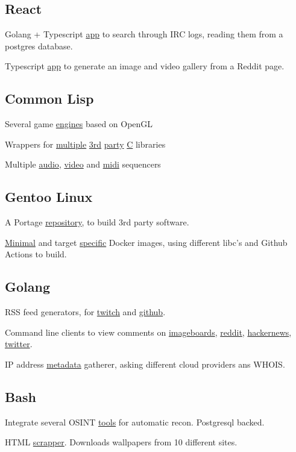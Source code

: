 \documentclass[11pt]{article}
\newcommand{\git}[2]{\href {https://github.com/azimut/#2} {#1}}
\newcommand{\project}{\item}
\begin{document}
\subsection{React}
\begin{projects}
\project Golang + Typescript {\git{app}{rounded}} to search through IRC logs, reading them from a postgres database.
\project Typescript {\git{app}{reddit-gallery}} to generate an image and video gallery from a Reddit page.
\end{projects}

\subsection{Common Lisp}
\begin{projects}
  \project Several game \git{engines}{scenic} based on OpenGL
  \project Wrappers for \git{multiple}{cl-gme} \git{3rd}{espeak-ng} \git{party}{aubio} \git{C}{cloud} libraries
  \project Multiple \git{audio}{meniere}, \git{video}{viseq} and \git{midi}{launchpad-csound} sequencers
\end{projects}

\subsection{Gentoo Linux}
\begin{projects}
\project A Portage \git{repository}{overlay}, to build 3rd party software.
\project \git{Minimal}{kubler-dock} and target \git{specific}{gantoo} Docker images, using different libc's and Github Actions to build.
\end{projects}

\subsection{Golang}
\begin{projects}
  \project RSS feed generators, for \git{twitch}{twitch-rss} and \git{github}{github-rss}.
  \project Command line clients to view comments on
    \git{imageboards}{lainviewer},
    \git{reddit}{redditviewer},
    \git{hackernews}{cli-view},
    \git{twitter}{cli-view}.
  \project IP address \git{metadata}{sunny} gatherer, asking different cloud providers ans WHOIS.
\end{projects}

\subsection{Bash}
\begin{projects}
\project Integrate several OSINT {\git{tools}{autoaim}} for automatic recon. Postgresql backed.
\project HTML {\git{scrapper}{daily-pic}}. Downloads wallpapers from 10 different sites.
\end{projects}
\end{document}
